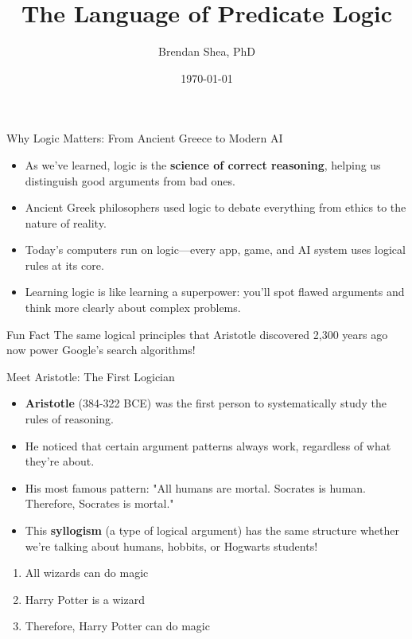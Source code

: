 \documentclass{beamer}
\title{The Language of Predicate Logic}
\author{Brendan Shea, PhD}
\date{\today}
\begin{document}
	
	\begin{frame}
		\titlepage
	\end{frame}
	
	\begin{frame}{Why Logic Matters: From Ancient Greece to Modern AI}
		\begin{itemize}
			\item As we've learned, logic is the \textbf{science of correct reasoning}, helping us distinguish good arguments from bad ones.
			\item Ancient Greek philosophers used logic to debate everything from ethics to the nature of reality.
			\item Today's computers run on logic—every app, game, and AI system uses logical rules at its core.
			\item Learning logic is like learning a superpower: you'll spot flawed arguments and think more clearly about complex problems.
		\end{itemize}
		
		\begin{alertblock}{Fun Fact}
			The same logical principles that Aristotle discovered 2,300 years ago now power Google's search algorithms!
		\end{alertblock}
	\end{frame}
	
	\begin{frame}{Meet Aristotle: The First Logician}
		\begin{itemize}
			\item \textbf{Aristotle} (384-322 BCE) was the first person to systematically study the rules of reasoning.
			\item He noticed that certain argument patterns always work, regardless of what they're about.
			\item His most famous pattern: "All humans are mortal. Socrates is human. Therefore, Socrates is mortal."
			\item This \textbf{syllogism} (a type of logical argument) has the same structure whether we're talking about humans, hobbits, or Hogwarts students!
		\end{itemize}
		
		\begin{example}
			\begin{enumerate}
				\item All wizards can do magic
				\item Harry Potter is a wizard
				\item Therefore, Harry Potter can do magic
			\end{enumerate}
		\end{example}
		
		
	\end{frame}
	
\end{document}
